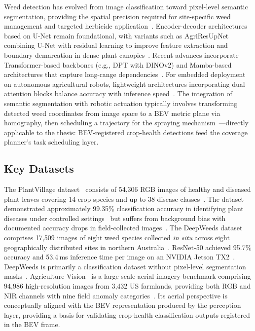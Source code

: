 \documentclass[12pt, a4paper]{article}
\begin{document}
Weed detection has evolved from image classification toward pixel-level semantic
segmentation, providing the spatial precision required for site-specific weed management
and targeted herbicide application~\cite{ref177, ref183, ref185}. Encoder-decoder
architectures based on U-Net remain foundational, with variants such as AgriResUpNet
combining U-Net with residual learning to improve feature extraction and boundary
demarcation in dense plant canopies~\cite{ref180}. Recent advances incorporate
Transformer-based backbones (e.g., DPT with DINOv2) and Mamba-based architectures that
capture long-range dependencies~\cite{ref178, ref183}. For embedded deployment on
autonomous agricultural robots, lightweight architectures incorporating dual attention
blocks balance accuracy with inference speed~\cite{ref182}. The integration of semantic
segmentation with robotic actuation typically involves transforming detected weed
coordinates from image space to a BEV metric plane via homography, then scheduling a
trajectory for the spraying mechanism~\cite{ref232}---directly applicable to the thesis:
BEV-registered crop-health detections feed the coverage planner's task scheduling layer.

\subsection{Key Datasets}

The PlantVillage dataset~\cite{ref157, ref159, ref160} consists of 54,306 RGB images of
healthy and diseased plant leaves covering 14 crop species and up to 38 disease
classes~\cite{ref157, ref159, ref163}. The dataset demonstrated approximately 99.35\%
classification accuracy in identifying plant diseases under controlled
settings~\cite{ref160, ref163} but suffers from background bias with documented accuracy
drops in field-collected images~\cite{ref154, ref203, ref204}. The DeepWeeds
dataset~\cite{ref167, ref168} comprises 17,509 images of eight weed species collected
\emph{in situ} across eight geographically distributed sites in northern
Australia~\cite{ref167, ref213}. ResNet-50 achieved 95.7\% accuracy and 53.4\,ms inference
time per image on an NVIDIA Jetson TX2~\cite{ref167, ref213}. DeepWeeds is primarily a
classification dataset without pixel-level segmentation masks~\cite{ref170, ref175}.
Agriculture-Vision~\cite{ref191, ref194} is a large-scale aerial-imagery benchmark
comprising 94,986 high-resolution images from 3,432 US farmlands, providing both RGB and
NIR channels with nine field anomaly categories~\cite{ref191, ref194}. Its aerial
perspective is conceptually aligned with the BEV representation produced by the perception
layer, providing a basis for validating crop-health classification outputs registered in
the BEV frame.
\end{document}
